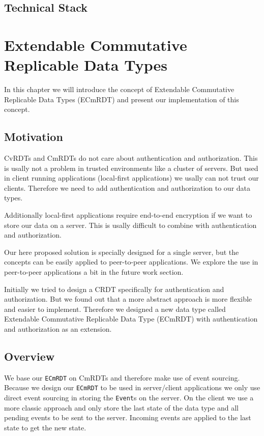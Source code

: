 \documentclass[
	ngerman,
	ruledheaders=section,   %
	class=report,		    %
	thesis={type=bachelor}, %
	accentcolor=9c,			%
	custommargins=false,    %
	marginpar=false,        %
	parskip=half-,          %
	fontsize=11pt,          %
]{tudapub}
\let\code\texttt
\begin{document}
\section{Technical Stack}

\chapter{Extendable Commutative Replicable Data Types}
In this chapter we will introduce the concept of Extendable Commutative Replicable Data Types (ECmRDT) and present our implementation of this concept.

\section{Motivation}
CvRDTs and CmRDTs do not care about authentication and authorization. This is usally not a problem in trusted environments like a cluster of servers. But used in client running applications (local-first applications) we usally can not trust our clients. Therefore we need to add authentication and authorization to our data types. 

Additionally local-first applications require end-to-end encryption if we want to store our data on a server. This is usally difficult to combine with authentication and authorization. 

Our here proposed solution is specially designed for a single server, but the concepts can be easily applied to peer-to-peer applications. We explore the use in peer-to-peer applications a bit in the future work section.

Initially we tried to design a CRDT specifically for authentication and authorization. But we found out that a more abstract approach is more flexible and easier to implement. Therefore we designed a new data type called Extendable Commutative Replicable Data Type (ECmRDT) with authentication and authorization as an extension.

\section{Overview}
We base our \code{ECmRDT} on CmRDTs and therefore make use of event sourcing. Because we design our \code{ECmRDT} to be used in server/client applications we only use direct event sourcing in storing the \code{Event}s on the server. On the client we use a more classic approach and only store the last state of the data type and all pending events to be sent to the server. Incoming events are applied to the last state to get the new state.
\end{document}
